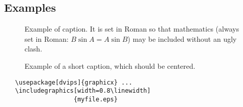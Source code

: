 \subsection{Examples}

%


\begin{figure}[t]
\begin{center}
\fbox{\rule{0pt}{2in} \rule{0.9\linewidth}{0pt}}
\end{center}
   \caption{Example of caption.  It is set in Roman so that mathematics
   (always set in Roman: $B \sin A = A \sin B$) may be included without an
   ugly clash.}
\label{fig:long}
\label{fig:onecol}
\end{figure}


\begin{figure*}
\begin{center}
\fbox{\rule{0pt}{2in} \rule{.9\linewidth}{0pt}}
\end{center}
   \caption{Example of a short caption, which should be centered.}
\label{fig:short}
\end{figure*}


{\small\begin{verbatim}
   \usepackage[dvips]{graphicx} ...
   \includegraphics[width=0.8\linewidth]
                   {myfile.eps}
\end{verbatim}
}

